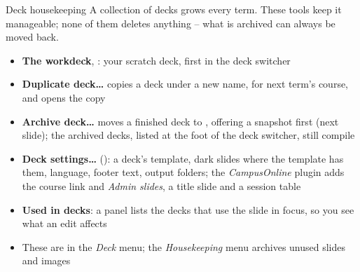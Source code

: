 
\begin{standardframe}{Deck housekeeping}
	\small
	A collection of decks grows every term. These tools keep it manageable;
	none of them deletes anything -- what is archived can always be moved back.
	\par\medskip
	\begin{itemize}
		\item \textbf{The workdeck}, : your scratch deck, first in the deck switcher
		\item \textbf{Duplicate deck\ldots} copies a deck under a new name, for next term's course, and opens the copy
		\item \textbf{Archive deck\ldots} moves a finished deck to , offering a snapshot first (next slide); the archived decks, listed at the foot of the deck switcher, still compile
		\item \textbf{Deck settings\ldots} (): a deck's template, dark slides where the template has them, language, footer text, output folders; the \emph{CampusOnline} plugin adds the course link and \emph{Admin slides}, a title slide and a session table
		\item \textbf{Used in decks}: a panel lists the decks that use the slide in focus, so you see what an edit affects
		\item These are in the \emph{Deck} menu; the \emph{Housekeeping} menu archives unused slides and images
	\end{itemize}
\end{standardframe}
